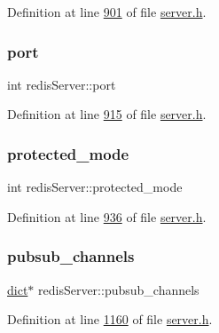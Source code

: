 Definition at line \hyperlink{server_8h_source_l00901}{901} of file \hyperlink{server_8h_source}{server.\+h}.

\mbox{\label{structredisServer_a0c5549470cf902a72d96fc2a693cec20}} 
\subsubsection{\texorpdfstring{port}{port}}
{\footnotesize\ttfamily int redis\+Server\+::port}



Definition at line \hyperlink{server_8h_source_l00915}{915} of file \hyperlink{server_8h_source}{server.\+h}.

\mbox{\label{structredisServer_afc9c1f0c23db3513319c9c4a6e2ed81b}} 
\subsubsection{\texorpdfstring{protected\+\_\+mode}{protected\_mode}}
{\footnotesize\ttfamily int redis\+Server\+::protected\+\_\+mode}



Definition at line \hyperlink{server_8h_source_l00936}{936} of file \hyperlink{server_8h_source}{server.\+h}.

\mbox{\label{structredisServer_a2ed0e16b10388930cf1eec1150578a01}} 
\subsubsection{\texorpdfstring{pubsub\+\_\+channels}{pubsub\_channels}}
{\footnotesize\ttfamily \hyperlink{structdict}{dict}$\ast$ redis\+Server\+::pubsub\+\_\+channels}



Definition at line \hyperlink{server_8h_source_l01160}{1160} of file \hyperlink{server_8h_source}{server.\+h}.

\mbox{\label{structredisServer_a515231e1a762233270adf52a3c53021e}} 
